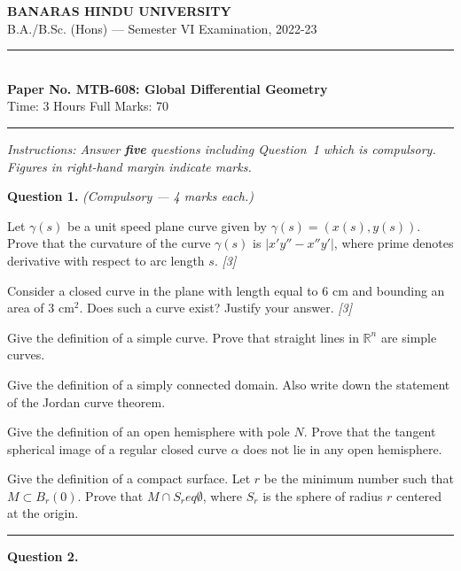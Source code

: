 \documentclass[11pt,a4paper]{article}
\newcommand{\pts}[1]{\hfill   \textit{[#1]}}
\begin{document}
\begin{center}
  {\large\bfseries BANARAS HINDU UNIVERSITY}\\[2pt]
  {\normalsize B.A./B.Sc. (Hons) --- Semester VI Examination, 2022-23}\\[6pt]
  \rule{0.8\linewidth}{0.5pt}\\[6pt]
  {\large\bfseries Paper No. MTB-608: Global Differential Geometry}\\[4pt]
  {\normalsize Time: 3 Hours \hfill Full Marks: 70}
\end{center}
\rule{\linewidth}{0.4pt}
\smallskip



\noindent   \textit{Instructions: Answer   \textbf{five} questions including Question~1 which is compulsory. Figures in right-hand margin indicate marks.}
\bigskip




\noindent   \textbf{Question 1.}   \textit{(Compulsory --- 4 marks each.)}

\begin{parts}
  \item Let $\gamma(s)$ be a unit speed plane curve given by $\gamma(s) = (x(s), y(s))$. Prove that the curvature of the curve $\gamma(s)$ is $|x'y'' - x''y'|$, where prime denotes derivative with respect to arc length $s$. \pts{3}
  \item Consider a closed curve in the plane with length equal to $6$ cm and bounding an area of $3$ cm$^2$. Does such a curve exist? Justify your answer. \pts{3}
  \item Give the definition of a simple curve. Prove that straight lines in $\mathbb{R}^n$ are simple curves.
  \item Give the definition of a simply connected domain. Also write down the statement of the Jordan curve theorem.
  \item Give the definition of an open hemisphere with pole $N$. Prove that the tangent spherical image of a regular closed curve $\alpha$ does not lie in any open hemisphere.
  \item Give the definition of a compact surface. Let $r$ be the minimum number such that $M \subset B_r(0)$. Prove that $M \cap S_r 
eq \emptyset$, where $S_r$ is the sphere of radius $r$ centered at the origin.
\end{parts}

\medskip\rule{\linewidth}{0.2pt}

\medskip


\noindent   \textbf{Question 2.}
\end{document}
